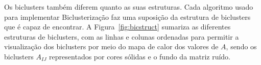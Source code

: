 \documentclass[
    12pt,                %
    oneside,            %
    a4paper,            %
    english,            %
    brazil                %
    ]{abntex2ppgsi}
\begin{document}
Os biclusters também diferem quanto as suas estruturas. Cada algoritmo usado para implementar Biclusterização faz uma suposição da estrutura de biclusters que é capaz de encontrar.
A Figura~\ref{fig:bicstruct} sumariza as diferentes estruturas de biclusters, com as linhas e colunas ordenadas para permitir a visualização dos biclusters por meio do mapa de calor dos valores de $A$, sendo os biclusters $A_{IJ}$ representados por cores sólidas e o fundo da matriz ruído.


\end{document}
